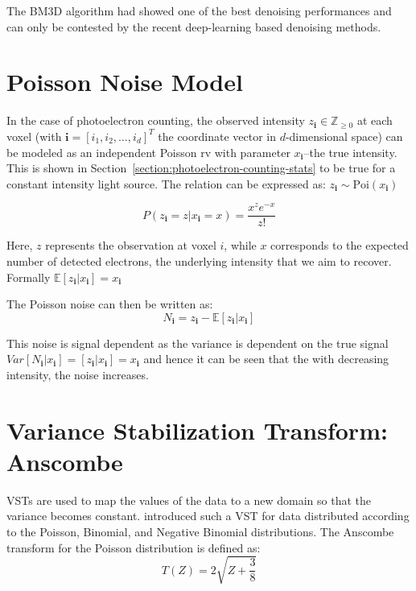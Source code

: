 The \gls{BM3D} algorithm had showed one of the best denoising performances and can only be contested by the recent deep-learning based denoising methods. 

\section{Poisson Noise Model}\label{sec:poisson-noise-model}
In the case of photoelectron counting, the observed intensity $z_{\mathbf{i}} \in \mathbb{Z}_{\geq 0}$ at each voxel (with $\mathbf{i} = [i_1, i_2, \dots, i_d]^T$ the coordinate vector in $d$-dimensional space) can be modeled as an independent Poisson \gls{rv} with parameter $x_{\mathbf{i}}$--the true intensity. This is shown in Section~\ref{section:photoelectron-counting-stats} to be true for a constant intensity light source. The relation can be expressed as: $z_{\mathbf{i}} \sim \text{Poi}(x_{\mathbf{i}})$

\begin{equation}
    P(z_{\mathbf{i}} = z| x_{\mathbf{i}} = x) = \frac{x^z e^{-x}}{z!}
\end{equation}


Here, $z$ represents the observation at voxel $i$, while $x$ corresponds to the expected number of detected electrons, the underlying intensity that we aim to recover. Formally $\mathbb{E}[z_{\mathbf{i}} | x_{\mathbf{i}}] = x_{\mathbf{i}}$

The Poisson noise can then be written as:
\begin{equation}
    N_{\mathbf{i}} = z_{\mathbf{i}} - \mathbb{E}[z_{\mathbf{i}} | x_{\mathbf{i}}]
\end{equation}

This noise is signal dependent as the variance is dependent on the true signal $Var[N_{\mathbf{i}} | x_{\mathbf{i}}] = [z_{\mathbf{i}} | x_{\mathbf{i}}] = x_{\mathbf{i}}$ and hence it can be seen that the with decreasing intensity, the noise increases.

\section{Variance Stabilization Transform: Anscombe}

\Glspl{VST} are used to map the values of the data to a new domain so that the variance becomes constant. \citeauthor{anscombeTransformationPoissonBinomial1948} \cite{anscombeTransformationPoissonBinomial1948} introduced such a \gls{VST} for data distributed according to the Poisson, Binomial, and Negative Binomial distributions. The Anscombe transform for the Poisson distribution is defined as:
\begin{equation}
    T(Z) = 2 \sqrt{Z + \frac{3}{8}}
\end{equation}

